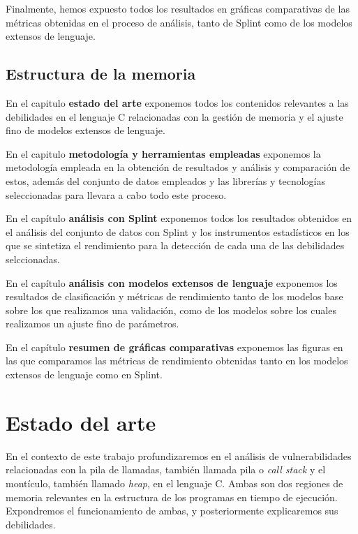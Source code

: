 \documentclass[12pt, a4paper, twoside]{article}
\begin{document}
Finalmente, hemos expuesto todos los resultados en gráficas comparativas de las métricas obtenidas en el proceso de análisis, tanto de Splint como de los modelos extensos de lenguaje.

\subsection{Estructura de la memoria}
En el capitulo \textbf{estado del arte} exponemos todos los contenidos relevantes a las debilidades en el lenguaje C relacionadas con la gestión de memoria y el ajuste fino de modelos extensos de lenguaje. 

En el capitulo \textbf{metodología y herramientas empleadas} exponemos la metodología empleada en la obtención de resultados y análisis y comparación de estos, además del conjunto de datos empleados y las librerías y tecnologías seleccionadas para llevara a cabo todo este proceso.

En el capítulo \textbf{análisis con Splint} exponemos todos los resultados obtenidos en el análisis del conjunto de datos con Splint y los instrumentos estadísticos en los que se sintetiza el rendimiento para la detección de cada una de las debilidades selccionadas.

En el capítulo \textbf{análisis con modelos extensos de lenguaje} exponemos los resultados de clasificación y métricas de rendimiento tanto de los modelos base sobre los que realizamos una validación, como de los modelos sobre los cuales realizamos un ajuste fino de parámetros.

En el capítulo \textbf{resumen de gráficas comparativas} exponemos las figuras en las que comparamos las métricas de rendimiento obtenidas tanto en los modelos extensos de lenguaje como en Splint.

\section{Estado del arte}
En el contexto de este trabajo profundizaremos en el análisis de vulnerabilidades relacionadas con la pila de llamadas, también llamada pila o \textit{call stack} y el montículo, también llamado \textit{heap}, en el lenguaje C. Ambas son dos regiones de memoria relevantes en la estructura de los programas en tiempo de ejecución.
Expondremos el funcionamiento de ambas, y posteriormente explicaremos sus debilidades.
\end{document}
